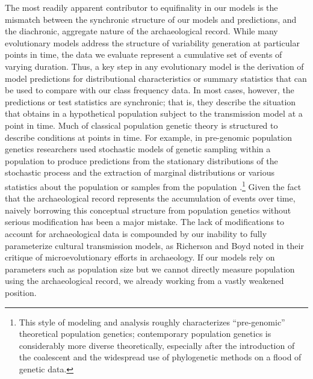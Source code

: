 The most readily apparent contributor to equifinality in our models is the mismatch between the synchronic structure of our models and predictions, and the diachronic, aggregate nature of the archaeological record. While many evolutionary models address the structure of variability generation at particular points in time, the data we evaluate represent a cumulative set of events of varying duration.  Thus, a key step in any evolutionary model is the derivation of model predictions for distributional characteristics or summary statistics that can be used to compare with our class frequency data. In most cases, however, the predictions or test statistics are synchronic; that is, they describe the situation that obtains in a hypothetical population subject to the transmission model at a point in time. Much of classical population genetic theory is structured to describe conditions at points in time.  For example, in pre-genomic population genetics researchers used stochastic models of genetic sampling within a population to produce predictions from the stationary distributions of the stochastic process and the extraction of marginal distributions or various statistics about the population or samples from the population .\footnote{This style of modeling and analysis roughly characterizes ``pre-genomic'' theoretical population genetics; contemporary population genetics is considerably more diverse theoretically, especially after the introduction of the coalescent \citep{Wakeley2008} and the widespread use of phylogenetic methods on a flood of genetic data.}   Given the fact that the archaeological record represents the accumulation of events over time, naively borrowing this conceptual structure from population genetics without serious modification has been a major mistake. The lack of modifications to account for archaeological data is compounded by our inability to fully parameterize cultural transmission models, as Richerson and Boyd \citeyearpar[301-302]{richerson2008response} noted in their critique of microevolutionary efforts in archaeology. If our models rely on parameters such as population size but we cannot directly measure population using the archaeological record, we already working from a vastly weakened position. 

